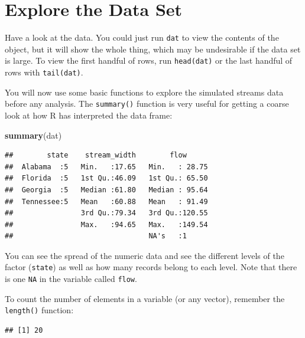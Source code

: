 \documentclass[]{book}
\newenvironment{Shaded}{\begin{snugshade}}{\end{snugshade}}
\newcommand{\KeywordTok}[1]{\textcolor[rgb]{0.13,0.29,0.53}{\textbf{#1}}}
\newcommand{\NormalTok}[1]{#1}
\newcommand{\OperatorTok}[1]{\textcolor[rgb]{0.81,0.36,0.00}{\textbf{#1}}}
\begin{document}
\hypertarget{data-summaries}{%
\section{Explore the Data Set}\label{data-summaries}}

Have a look at the data. You could just run \texttt{dat} to view the contents of the object, but it will show the whole thing, which may be undesirable if the data set is large. To view the first handful of rows, run \texttt{head(dat)} or the last handful of rows with \texttt{tail(dat)}.

You will now use some basic functions to explore the simulated streams data before any analysis. The \texttt{summary()} function is very useful for getting a coarse look at how R has interpreted the data frame:

\begin{Shaded}
\begin{Highlighting}[]
\KeywordTok{summary}\NormalTok{(dat)}
\end{Highlighting}
\end{Shaded}

\begin{verbatim}
##        state    stream_width        flow       
##  Alabama  :5   Min.   :17.65   Min.   : 28.75  
##  Florida  :5   1st Qu.:46.09   1st Qu.: 65.50  
##  Georgia  :5   Median :61.80   Median : 95.64  
##  Tennessee:5   Mean   :60.88   Mean   : 91.49  
##                3rd Qu.:79.34   3rd Qu.:120.55  
##                Max.   :94.65   Max.   :149.54  
##                                NA's   :1
\end{verbatim}

You can see the spread of the numeric data and see the different levels of the factor (\texttt{state}) as well as how many records belong to each level. Note that there is one \texttt{NA} in the variable called \texttt{flow}.

To count the number of elements in a variable (or any vector), remember the \texttt{length()} function:

\begin{Shaded}
\end{Shaded}

\begin{verbatim}
## [1] 20
\end{verbatim}
\end{document}

